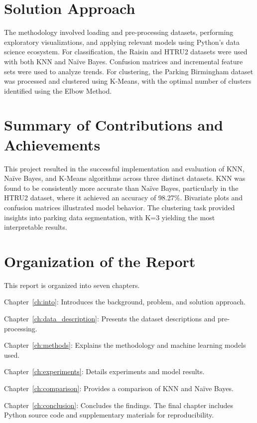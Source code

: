 \section{Solution Approach}
\label{sec:intro_sol}

The methodology involved loading and pre-processing datasets, performing exploratory visualizations, and applying relevant models using Python’s data science ecosystem. For classification, the Raisin and HTRU2 datasets were used with both KNN and Naïve Bayes. Confusion matrices and incremental feature sets were used to analyze trends. For clustering, the Parking Birmingham dataset was processed and clustered using K-Means, with the optimal number of clusters identified using the Elbow Method.

\section{Summary of Contributions and Achievements}
\label{sec:intro_sum_results}

This project resulted in the successful implementation and evaluation of KNN, Naïve Bayes, and K-Means algorithms across three distinct datasets. KNN was found to be consistently more accurate than Naïve Bayes, particularly in the HTRU2 dataset, where it achieved an accuracy of 98.27\%. Bivariate plots and confusion matrices illustrated model behavior. The clustering task provided insights into parking data segmentation, with K=3 yielding the most interpretable results.

\section{Organization of the Report}
\label{sec:intro_org}

This report is organized into seven chapters.

Chapter~\ref{ch:into}: Introduces the background, problem, and solution approach.

Chapter~\ref{ch:data_description}: Presents the dataset descriptions and pre-processing. 

Chapter~\ref{ch:methods}: Explains the methodology and machine learning models used. 

Chapter~\ref{ch:experiments}: Details experiments and model results. 

Chapter~\ref{ch:comparison}: Provides a comparison of KNN and Naïve Bayes.

Chapter~\ref{ch:conclusion}: Concludes the findings. The final chapter includes Python source code and supplementary materials for reproducibility.